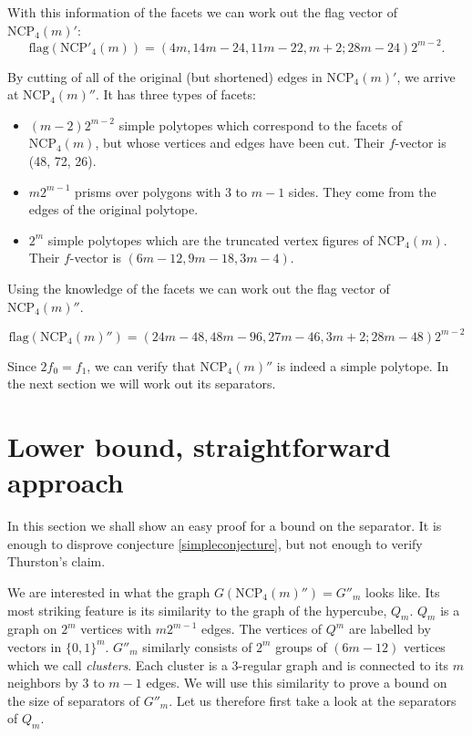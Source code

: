 \documentclass[a4paper,12pt]{book}
\theoremstyle{plain}
\theoremstyle{definition}
\newcommand\NC{\textrm{NCP}}
\begin{document}
With this information of the facets we can work out the flag vector of $\NC_4(m)'$:
\begin{equation}
 \textrm{flag}(\NC'_4(m)) = (4m, 14m-24, 11m-22, m+2; 28m-24)2^{m-2}.
\end{equation}

By cutting of all of the original (but shortened) edges in $\NC_4(m)'$, we arrive at 
$\NC_4(m)''$. It has three types of facets:

\begin{itemize}
 \item $(m-2)2^{m-2}$ simple polytopes which correspond to the facets of 
$\NC_4(m)$, but whose vertices and edges have been cut. Their $f$-vector is 
(48, 72, 26).
\item $m2^{m-1}$ prisms over polygons with $3$ to $m-1$ sides. They come from 
the edges of the original polytope.
\item $2^m$ simple polytopes which are the truncated vertex figures of 
$\NC_4(m)$. Their $f$-vector is $(6m - 12, 9m-18, 3m-4)$.
\end{itemize}

Using the knowledge of the facets we can work out the flag vector of 
$\NC_4(m)''$.

\begin{equation}
 \textrm{flag}(\NC_4(m)'') = (24m-48, 48m-96, 27m - 46, 3m+2; 28m -48)2^{m-2}
\end{equation}

Since $2f_0 = f_1$, we can verify that $\NC_4(m)''$ is indeed a simple 
polytope. In the next section we will work out its separators.

\section{Lower bound, straightforward approach}

In this section we shall show an easy proof for a bound on the separator. It
is enough to disprove conjecture \ref{simpleconjecture}, but not enough to verify Thurston's
claim.

We are interested in what the graph $G(\NC_4(m)'') = G''_m$ looks like. Its 
most striking feature is its similarity to the graph of the hypercube, $Q_m$. 
$Q_m$ is a graph on $2^m$ vertices with $m2^{m-1}$ edges. The vertices of $Q^m$
are labelled by vectors in $\{0,1\}^m$. $G''_m$ 
similarly consists of $2^m$ groups of $(6m-12)$ vertices which we call 
\textit{clusters}. Each cluster is a 3-regular graph and is connected to its
$m$ neighbors by 3 to $m-1$ edges. We will use this similarity to 
prove a bound on the size of separators of $G''_m$. Let us therefore first take a 
look at the separators of $Q_m$.
\end{document}
